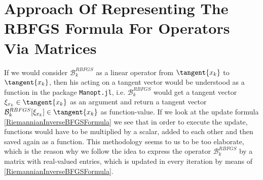 \section{Approach Of Representing The RBFGS Formula For Operators Via Matrices}
\label{Section5.1}

If we would consider $\mathcal{B}^{RBFGS}_{k}$ as a linear operator from $\tangent{x_k}$ to $\tangent{x_k}$, then his acting on a tangent vector would be understood as a function in the package \lstinline!Manopt.jl!, i.e. $\mathcal{B}^{RBFGS}_{k}$ would get a tangent vector $\xi_{x_k} \in \tangent{x_k}$ as an argument and return a tangent vector $\mathcal{B}^{RBFGS}_{k} [\xi_{x_k}] \in \tangent{x_k}$ as function-value. If we look at the update formula \cref{RiemannianInverseBFGSFormula} we see that in order to execute the update, functions would have to be multiplied by a scalar, added to each other and then saved again as a function. This methodology seems to us to be too elaborate, which is the reason why we follow the idea to express the operator $\mathcal{B}^{RBFGS}_{k}$ by a matrix with real-valued entries, which is updated in every iteration by means of \cref{RiemannianInverseBFGSFormula}. \\

